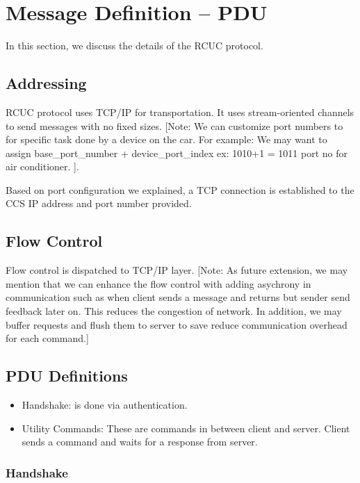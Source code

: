\section{Message Definition -- PDU}
\label{sec:pdus}

In this section, we discuss the details of the \textsf{RCUC} protocol.

\subsection{Addressing}
\label{sec:pdus:addr}
\textsf{RCUC} protocol uses TCP/IP for transportation. It uses stream-oriented channels to send messages with no fixed sizes. [Note: We can customize port numbers to for specific task done by a device on the car. For example: We may want to assign base\_port\_number + device\_port\_index ex: 1010+1 = 1011 port no for air conditioner. ].

Based on port configuration we explained, a TCP connection is established to the \textsf{CCS} IP address and port number provided.
\subsection{Flow Control}
\label{sec:pdus:flow}
Flow control is dispatched to TCP/IP layer. [Note: As future extension, we may mention that we can enhance the flow control with adding asychrony in communication such as when client sends a message  and returns but sender send feedback later on. This reduces the congestion of network. In addition, we may buffer requests and flush them to server to save reduce communication overhead for each command.]
 
\subsection{PDU Definitions}
\label{sec:pdus:pdu}
\begin{itemize}
\item \textsf{Handshake}: is done via authentication.
\item \textsf{Utility Commands}: These are commands in between client and server. Client sends a command and waits for a response from server.
  \end{itemize}

\subsubsection{Handshake}
\label{sec:pdus:pdu:hs}

